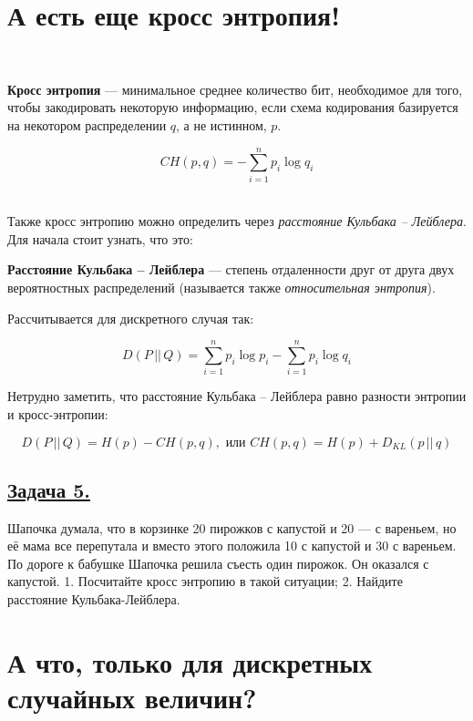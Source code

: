 \section*{А есть еще кросс энтропия!}~\
\\

\begin{siderules}
    \textbf{Кросс энтропия} --- минимальное среднее количество бит, необходимое для того, чтобы закодировать некоторую информацию, если схема кодирования базируется на некотором распределении $q$, а не истинном, $p$.
\end{siderules}

\[CH(p, q)=-\sum\limits_{i=1}^{n}p_i\log q_i \]

\\

Также кросс энтропию можно определить через \textit{расстояние Кульбака -- Лейблера}. Для начала стоит узнать, что это:

\begin{siderules}
    \textbf{Расстояние Кульбака -- Лейблера} --- степень отдаленности друг от друга двух вероятностных распределений (называется также \textit{относительная энтропия}). \end{siderules}
    
    Рассчитывается для дискретного случая так:

    \[D(P\, ||\, Q)=\sum\limits_{i=1}^n p_i\log p_i-\sum\limits_{i=1}^n p_i\log q_i\]

Нетрудно заметить, что расстояние Кульбака -- Лейблера равно разности энтропии и кросс-энтропии:

\[D(P\, ||\, Q)=H(p)-CH(p,q), \text{ или } CH(p, q)=H(p)+D_{KL}(p\, || \, q)\]

\subsection*{\hyperref[sec:sol_problem5]{Задача 5.}}\label{sec:problem5} Шапочка думала, что в корзинке 20 пирожков с капустой и 20 — с вареньем, но её мама все перепутала и вместо этого положила 10 с капустой и 30 с вареньем. По дороге к бабушке Шапочка решила съесть один пирожок. Он оказался с капустой. 
1.	Посчитайте кросс энтропию в такой ситуации;
2.	Найдите расстояние Кульбака-Лейблера.

\section*{А что, только для дискретных случайных величин?}~\
\\

